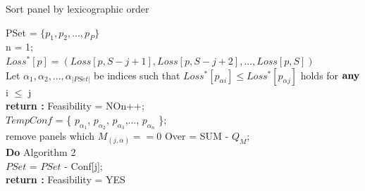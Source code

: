 \documentclass[conference]{IEEEtran}
\begin{document}
\begin{algorithm}
\caption{Sort panel by lexicographic order}
\LinesNumbered
{}  
PSet = $\{p_1, p_2,...,p_P\}$\\
    {n = 1;\\
        {$Loss^*[p] = (Loss[p,S-j+1], Loss[p,S-j+2],..., Loss[p,S])$\\
        Let $\alpha_1, \alpha_2,..., \alpha_{|PSet|}$ be indices such that $Loss^*[p_{\alpha i}] \leq Loss^*[p_{\alpha j}]$ holds for $ \textup{\textbf{any}}$ i $\leq$ j\\
        }
        {
            {\textup{\textbf{return :}} Feasibility = NO}n++;\\}
        $TempConf$ = \{ $p_{\alpha_1}$, $p_{\alpha_2}$, $p_{\alpha_3}$,..., $p_{\alpha_n}$ \};\\
        {remove panels which $M_{(j,\alpha)} == 0$}
        Over = SUM - $Q_M$;\\\textup{\textbf{Do} Algorithm 2}\\
        $PSet$ = $PSet$ - Conf[j];\\
    }
    \textup{\textbf{return :}} Feasibility = YES
\end{algorithm}
\end{document}
